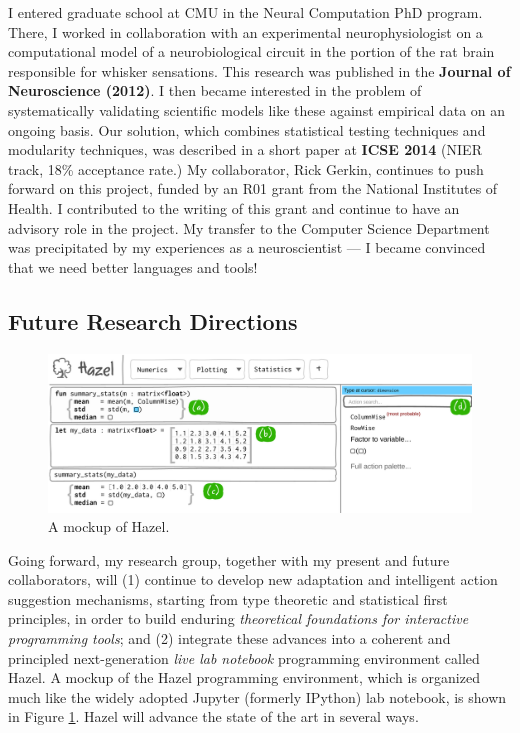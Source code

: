 \documentclass[9pt]{extarticle}
\begin{document}
I entered graduate school at CMU in the Neural Computation PhD program. There, I worked in collaboration with an experimental neurophysiologist on a computational model of a neurobiological circuit in the portion of the rat brain responsible for whisker sensations. This research was published in the \textbf{Journal of Neuroscience (2012)}. I then became interested in the problem of systematically validating scientific models like these against empirical data on an ongoing basis. Our solution, which combines statistical testing techniques and modularity techniques, was described in a short paper at \textbf{ICSE 2014} (NIER track, 18\% acceptance rate.) My collaborator, Rick Gerkin, continues to push forward on this project, funded by an R01 grant from the National Institutes of Health. I contributed to the writing of this grant and continue to have an advisory role in the project. My transfer to the Computer Science Department was precipitated by my experiences as a neuroscientist --- I became convinced that we need better languages and tools!


\vspace{-8px}
\subsection*{Future Research Directions}
\vspace{-4px}

\begin{figure}
\vspace{-2ex}
\centering
\includegraphics[width=\textwidth]{mockup-1}
\vspace{-4.5ex}
\caption{A mockup of Hazel.}
\label{fig:hazel-mockup}
\vspace{-2ex}
\end{figure}

Going forward, my research group, together with my present and future collaborators, will (1) continue to develop new adaptation and intelligent action suggestion mechanisms, starting from type theoretic and statistical first principles, in order to build enduring \emph{theoretical foundations for interactive programming tools}; and (2) integrate these advances into a coherent and principled next-generation \emph{live lab notebook} programming environment called Hazel. A mockup of the Hazel programming environment, which is organized much like the widely adopted Jupyter (formerly IPython) lab notebook, is shown in Figure \ref{fig:hazel-mockup}. Hazel will advance the state of the art in several ways. 
\end{document}
